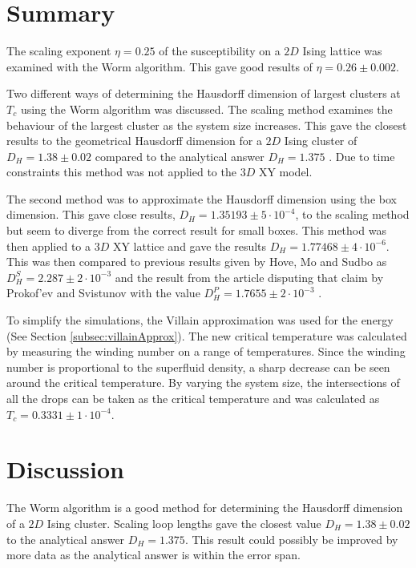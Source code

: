 \section{Summary}
\label{sec:Summary}

The scaling exponent $\eta = 0.25$ of the susceptibility on a $2D$ Ising lattice was examined with the Worm algorithm. This gave good results of $\eta = 0.26 \pm 0.002$.

Two different ways of determining the Hausdorff dimension of largest clusters at $T_c$ using the Worm algorithm was discussed. The scaling method examines the behaviour of the largest cluster as the system size increases. This gave the closest results to the geometrical Hausdorff dimension for a $2D$ Ising cluster of $D_H = 1.38 \pm 0.02$ compared to the analytical answer $D_H = 1.375$ \cite{Duplantier:GeoHausdorff}. Due to time constraints this method was not applied to the $3D$ XY model.

The second method was to approximate the Hausdorff dimension using the box dimension. This gave close results, $D_H = 1.35193 \pm 5 \cdot 10^{-4}$, to the scaling method but seem to diverge from the correct result for small boxes. This method was then applied to a $3D$ XY lattice and gave the results $D_H = 1.77468 \pm 4 \cdot 10^{-6}$. This was then compared to previous results given by Hove, Mo and Sudbo as $D_H^S = 2.287 \pm 2 \cdot 10^{-3}$ \cite{Hove:hausdorff_crit_fluctuations} and the result from the article disputing that claim by Prokof'ev and Svistunov with the value $D_H^P = 1.7655 \pm 2 \cdot 10^{-3}$ \cite{Prokofev:comment_on_hove_hausdorff_crit_fluct}.

To simplify the simulations, the Villain approximation was used for the energy (See Section \ref{subsec:villainApprox}). The new critical temperature was calculated by measuring the winding number on a range of temperatures. Since the winding number is proportional to the superfluid density, a sharp decrease can be seen around the critical temperature. By varying the system size, the intersections of all the drops can be taken as the critical temperature and was calculated as $T_c = 0.3331 \pm 1 \cdot 10^{-4}$.

\section{Discussion}
\label{sec:Discussion}

The Worm algorithm is a good method for determining the Hausdorff dimension of a $2D$ Ising cluster. Scaling loop lengths gave the closest value $D_H = 1.38 \pm 0.02$ to the analytical answer $D_H = 1.375$\cite{Duplantier:GeoHausdorff}. This result could possibly be improved by more data as the analytical answer is within the error span.

